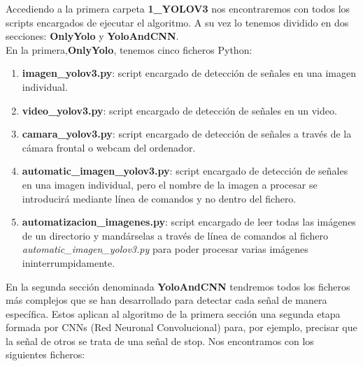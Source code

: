 Accediendo a la primera carpeta \textbf{1_YOLOV3} nos encontraremos con todos los scripts encargados de ejecutar el algoritmo. A su vez lo tenemos dividido en dos secciones: \textbf{OnlyYolo} y \textbf{YoloAndCNN}. \\
En la primera,\textbf{OnlyYolo}, tenemos cinco ficheros Python:

\begin{enumerate}
\item \textbf{imagen_yolov3.py}: script encargado de detección de señales en una imagen individual.
\item \textbf{video_yolov3.py}: script encargado de detección de señales en un video.
\item \textbf{camara_yolov3.py}: script encargado de detección de señales a través de la cámara frontal o webcam del ordenador.
\item \textbf{automatic_imagen_yolov3.py}: script encargado de detección de señales en una imagen individual, pero el nombre de la imagen a procesar se introducirá mediante línea de comandos y no dentro del fichero.
\item \textbf{automatizacion_imagenes.py}: script encargado de leer todas las imágenes de un directorio y mandárselas a través de línea de comandos al fichero \textit{automatic_imagen_yolov3.py} para poder procesar varias imágenes ininterrumpidamente.
\end{enumerate}

En la segunda sección denominada \textbf{YoloAndCNN} tendremos todos los ficheros más complejos que se han desarrollado para detectar cada señal de manera específica. Estos aplican al algoritmo de la primera sección una segunda etapa formada por CNNs (Red Neuronal Convolucional) para, por ejemplo, precisar que la señal de otros se trata de una señal de stop. Nos encontramos con los siguientes ficheros:

